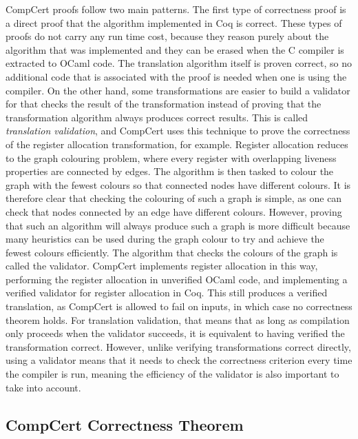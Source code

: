 \gls{CompCert} proofs follow two main patterns.  The first type of correctness
proof is a direct proof that the algorithm implemented in Coq is correct.  These
types of proofs do not carry any run time cost, because they reason purely about
the algorithm that was implemented and they can be erased when the C compiler is
extracted to OCaml code.  The translation algorithm itself is proven correct, so
no additional code that is associated with the proof is needed when one is using
the compiler.  On the other hand, some transformations are easier to build a
validator for that checks the result of the transformation instead of proving
that the transformation algorithm always produces correct results.  This is
called \emph{\gls{translation validation}}, and CompCert uses this technique to
prove the correctness of the register allocation transformation, for example.
Register allocation reduces to the graph colouring problem, where every register
with overlapping liveness properties are connected by edges.  The algorithm is
then tasked to colour the graph with the fewest colours so that connected nodes
have different colours.  It is therefore clear that checking the colouring of
such a graph is simple, as one can check that nodes connected by an edge have
different colours.  However, proving that such an algorithm will always produce
such a graph is more difficult because many heuristics can be used during the
graph colour to try and achieve the fewest colours efficiently.  The algorithm
that checks the colours of the graph is called the validator.  CompCert
implements register allocation in this way, performing the register allocation
in unverified OCaml code, and implementing a verified validator for register
allocation in Coq.  This still produces a verified translation, as CompCert is
allowed to fail on inputs, in which case no correctness theorem holds.  For
translation validation, that means that as long as compilation only proceeds
when the validator succeeds, it is equivalent to having verified the
transformation correct.  However, unlike verifying transformations correct
directly, using a validator means that it needs to check the correctness
criterion every time the compiler is run, meaning the efficiency of the
validator is also important to take into account.

\subsection{CompCert Correctness Theorem}%
\label{sec:bg:compcert-correctness-theorem}

